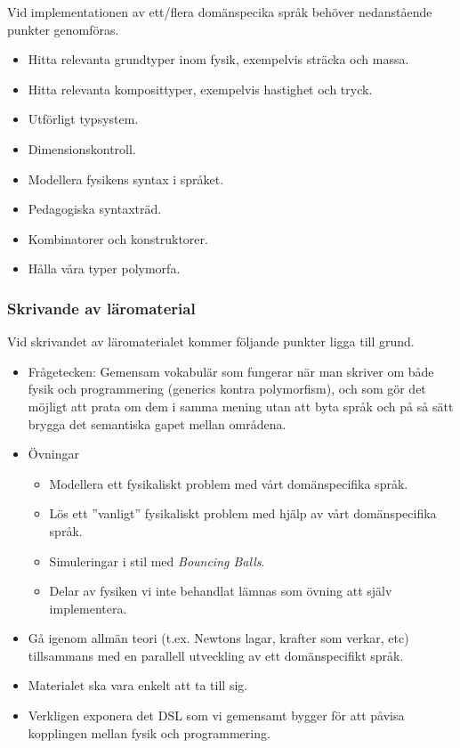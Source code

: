 \documentclass[12pt,a4paper]{article}
\begin{document}
Vid implementationen av ett/flera domänspecika språk behöver nedanstående punkter genomföras.

\begin{itemize}
    \item Hitta relevanta grundtyper inom fysik, exempelvis sträcka och massa.
    \item Hitta relevanta komposittyper, exempelvis hastighet och tryck.
    \item Utförligt typsystem.
    \item Dimensionskontroll.
    \item Modellera fysikens syntax i språket.
    \item Pedagogiska syntaxträd.
    \item Kombinatorer och konstruktorer.
    \item Hålla våra typer polymorfa.
\end{itemize}

\subsubsection*{Skrivande av läromaterial}

Vid skrivandet av läromaterialet kommer följande punkter ligga till grund.

\begin{itemize}
    \item Frågetecken: Gemensam vokabulär som fungerar när man skriver om både fysik och programmering (generics kontra polymorfism), och som gör det möjligt att prata om dem i samma mening utan att byta språk och på så sätt brygga det semantiska gapet mellan områdena.
    \item Övningar
        \begin{itemize}
            \item Modellera ett fysikaliskt problem med vårt domänspecifika språk.
            \item Lös ett ''vanligt'' fysikaliskt problem med hjälp av vårt domänspecifika språk.
            \item Simuleringar i stil med \textit{Bouncing Balls}.
            \item Delar av fysiken vi inte behandlat lämnas som övning att själv implementera.
        \end{itemize}
    \item Gå igenom allmän teori (t.ex. Newtons lagar, krafter som verkar, etc) tillsammans med en parallell utveckling av ett domänspecifikt språk.
    \item Materialet ska vara enkelt att ta till sig.
    \item Verkligen exponera det DSL som vi gemensamt bygger för att påvisa kopplingen mellan fysik och programmering.
\end{itemize}
\end{document}
